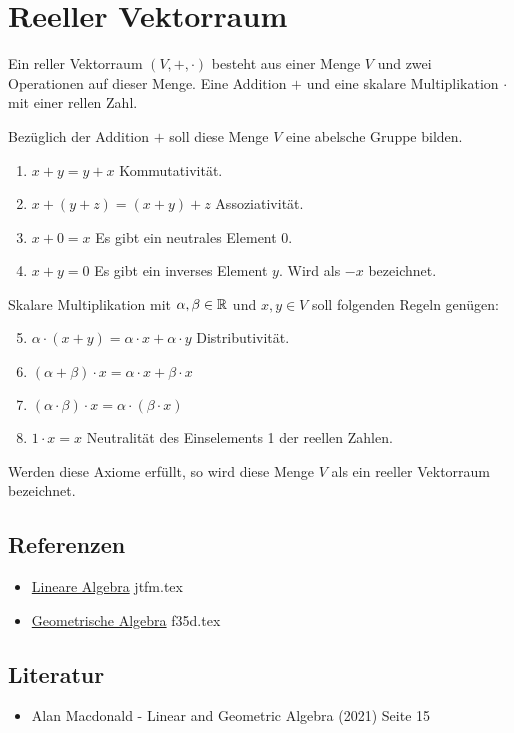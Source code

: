 \documentclass{sajzk}
\begin{document}
\section{Reeller Vektorraum} 
\label{3g4f}


Ein reller Vektorraum $(V, +, \cdot)$ besteht aus einer Menge $V$ und zwei
Operationen auf dieser Menge. Eine Addition $+$ und eine skalare
Multiplikation $\cdot$ mit einer rellen Zahl.

Bezüglich der Addition $+$ soll diese Menge $V$ eine abelsche Gruppe bilden.

\begin{enumerate}
    \item $x + y = y + x$ Kommutativität.
    \item $x + (y + z) = (x + y) + z$ Assoziativität.
    \item $x + 0 = x$ Es gibt ein neutrales Element $0$.
    \item $x + y = 0$ Es gibt ein inverses Element $y$. Wird als $-x$ bezeichnet.
\end{enumerate}

Skalare Multiplikation mit $\alpha, \beta \in \mathbb{R}$ und $x, y \in V$ soll
folgenden Regeln genügen:

\begin{enumerate}
    \setcounter{enumi}{4}
    \item $\alpha\cdot(x + y) = \alpha\cdot x +\alpha\cdot y$ Distributivität.
    \item $(\alpha + \beta)\cdot x = \alpha\cdot x + \beta\cdot x$
    \item $(\alpha\cdot\beta)\cdot x = \alpha\cdot(\beta\cdot x)$
    \item $1\cdot x = x$ Neutralität des Einselements 1 der reellen Zahlen.
\end{enumerate}

Werden diese Axiome erfüllt, so wird diese Menge $V$ als ein reeller
Vektorraum bezeichnet.

\subsection{Referenzen}
\begin{itemize}
  \item \href{jtfm.pdf}{Lineare Algebra} jtfm.tex
  \item \href{f35d.pdf}{Geometrische Algebra} f35d.tex
\end{itemize}

\subsection{Literatur}
\begin{itemize}
  \item Alan Macdonald - Linear and Geometric Algebra (2021) Seite 15
\end{itemize}
\end{document}
